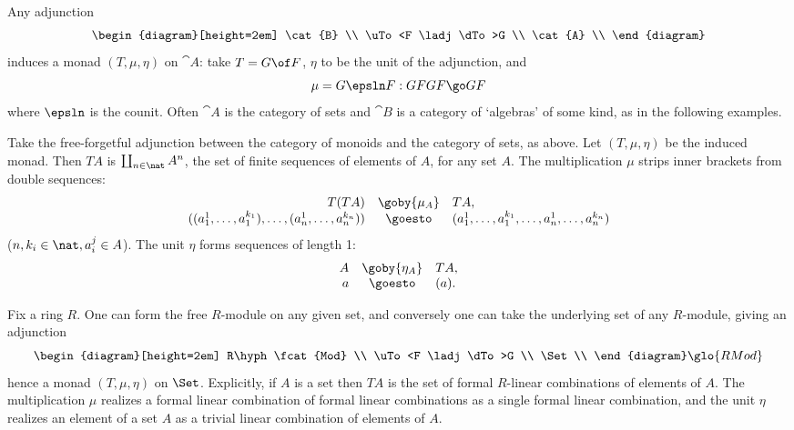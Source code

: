 Any adjunction
\[
\begin{diagram}[height=2em]
\cat{B}	\\
\uTo<F \ladj \dTo>G	\\
\cat{A}	\\
\end{diagram}
\]
induces a monad $(T, \mu, \eta)$ on $\cat{A}$: take $T= G\of F$, $\eta$
to be the unit of the adjunction, and 
\[
\mu = G\epsln F: GFGF \go GF
\]
where $\epsln$ is the counit.  Often $\cat{A}$ is the category of sets and
$\cat{B}$ is a category of `algebras' of some kind, as in the following
examples. 

\begin{example}	
Take the free-forgetful%
%
%
adjunction between the category of monoids and the
category of sets, as above.  Let $(T, \mu, \eta)$ be the induced monad.
Then $TA$ is $\coprod_{n\in\nat} A^n$, the set of finite sequences of
elements of $A$, for any set $A$.  The multiplication $\mu$ strips inner
brackets from double sequences:
\[
\begin{array}{rcl}
T(TA)		&\goby{\mu_A}		&TA,	\\

((a_1^1, \ldots, a_1^{k_1}), \ldots, (a_n^1, \ldots, a_n^{k_n}))	&
\goesto	&
(a_1^1, \ldots, a_1^{k_1}, \ldots, a_n^1, \ldots, a_n^{k_n})	
\end{array}
\]
($n, k_i \in \nat, a_i^j \in A$).  The unit $\eta$ forms sequences of
length 1:
\[
\begin{array}{rcl}
A	&\goby{\eta_A}	&TA,	\\
a	&\goesto	&(a).
\end{array}
\]
\end{example}

\begin{example}	
Fix a ring $R$.  One can form the free $R$-module%
%
%
on any given set, and
conversely one can take the underlying set of any $R$-module, giving an
adjunction 
\[
\begin{diagram}[height=2em]
R\hyph\fcat{Mod}	\\
\uTo<F \ladj \dTo>G	\\
\Set	\\
\end{diagram}%
% 
\glo{RMod}
%
\]
hence a monad $(T, \mu, \eta)$ on $\Set$.  Explicitly, if $A$ is a set then
$TA$ is the set of formal $R$-linear combinations of elements of $A$.  The
multiplication $\mu$ realizes a formal linear combination of formal linear
combinations as a single formal linear combination, and the unit $\eta$
realizes an element of a set $A$ as a trivial linear combination of
elements of $A$.
\end{example}


